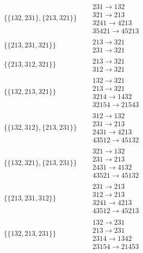 \begin{tiny}
\begin{align}
\begin{matrix}
\end{matrix}
\\
\{\{132, 231\}, \{213, 321\}\}
\quad
&
\begin{matrix}
231 \to 132\\321 \to 213\\3241 \to 4213\\35421 \to 45213
\end{matrix}
\\
\{\{213, 231, 321\}\}
\quad
&
\begin{matrix}
213 \to 321\\231 \to 321
\end{matrix}
\\
\{\{213, 312, 321\}\}
\quad
&
\begin{matrix}
213 \to 321\\312 \to 321
\end{matrix}
\\
\{\{132, 213, 321\}\}
\quad
&
\begin{matrix}
132 \to 321\\213 \to 321\\3214 \to 1432\\32154 \to 21543
\end{matrix}
\\
\{\{132, 312\}, \{213, 231\}\}
\quad
&
\begin{matrix}
312 \to 132\\231 \to 213\\2431 \to 4213\\43512 \to 45132
\end{matrix}
\\
\{\{132, 321\}, \{213, 231\}\}
\quad
&
\begin{matrix}
321 \to 132\\231 \to 213\\2431 \to 4132\\43521 \to 45132
\end{matrix}
\\
\{\{213, 231, 312\}\}
\quad
&
\begin{matrix}
231 \to 213\\312 \to 213\\3241 \to 4213\\43512 \to 45213
\end{matrix}
\\
\{\{132, 213, 231\}\}
\quad
&
\begin{matrix}
132 \to 231\\213 \to 231\\2314 \to 1342\\23154 \to 21453

\end{matrix}
\end{align}
\end{tiny}
